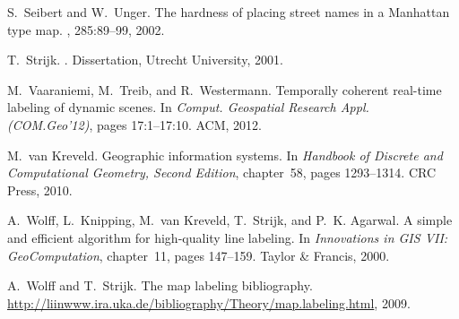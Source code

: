 \documentclass[a4paper,11pt]{article}
\begin{document}
{\begin{thebibliography}{10}
S.~Seibert and W.~Unger.
\newblock The hardness of placing street names in a {Manhattan} type map.
, 285:89--99, 2002.

T.~Strijk.
.
\newblock Dissertation, Utrecht University, 2001.

M.~Vaaraniemi, M.~Treib, and R.~Westermann.
\newblock Temporally coherent real-time labeling of dynamic scenes.
\newblock In {\em Comput. Geospatial Research Appl. (COM.Geo'12)}, pages
  17:1--17:10. ACM, 2012.

M.~van Kreveld.
\newblock Geographic information systems.
\newblock In {\em Handbook of Discrete and Computational Geometry, Second
  Edition}, chapter~58, pages 1293--1314. CRC Press, 2010.

A.~Wolff, L.~Knipping, M.~van Kreveld, T.~Strijk, and P.~K. Agarwal.
\newblock A simple and efficient algorithm for high-quality line labeling.
\newblock In {\em Innovations in GIS VII: GeoComputation}, chapter~11, pages
  147--159. Taylor \& Francis, 2000.

A.~Wolff and T.~Strijk.
\newblock The map labeling bibliography.
\newblock \url{
  http://liinwww.ira.uka.de/bibliography/Theory/map.labeling.html}, 2009.

\end{thebibliography}

}
\end{document}
